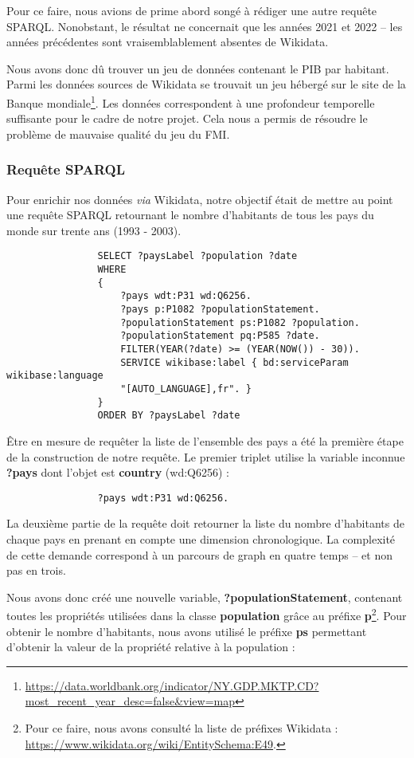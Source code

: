 \documentclass[hidelinks, 12pt]{article}
\begin{document}
			Pour ce faire, nous avions de prime abord songé à rédiger une autre requête SPARQL. Nonobstant, le résultat ne concernait que les années 2021 et 2022 -- les années précédentes sont vraisemblablement absentes de Wikidata.
		
			Nous avons donc dû trouver un jeu de données contenant le PIB par habitant. Parmi les données sources de Wikidata se trouvait un jeu hébergé sur le site de la Banque mondiale\footnote{\url{https://data.worldbank.org/indicator/NY.GDP.MKTP.CD?most_recent_year_desc=false&view=map}}. Les données correspondent à une profondeur temporelle suffisante pour le cadre de notre projet. Cela nous a permis de résoudre le problème de mauvaise qualité du jeu du FMI.
		
		
			\subsubsection{Requête SPARQL}
			
			Pour enrichir nos données \emph{via} Wikidata, notre objectif était de mettre au point une requête SPARQL retournant le nombre d'habitants de tous les pays du monde sur trente ans (1993 - 2003).
			
			\begin{verbatim}
				SELECT ?paysLabel ?population ?date
				WHERE
				{
					?pays wdt:P31 wd:Q6256.
					?pays p:P1082 ?populationStatement.
					?populationStatement ps:P1082 ?population.
					?populationStatement pq:P585 ?date.
					FILTER(YEAR(?date) >= (YEAR(NOW()) - 30)).
					SERVICE wikibase:label { bd:serviceParam wikibase:language 
					"[AUTO_LANGUAGE],fr". }
				}
				ORDER BY ?paysLabel ?date
			\end{verbatim}
		
			Être en mesure de requêter la liste de l'ensemble des pays a été la première étape de la construction de notre requête. Le premier triplet utilise la variable inconnue \textbf{?pays} dont l'objet est \textbf{country} (wd:Q6256) :
			
			\begin{verbatim}
				?pays wdt:P31 wd:Q6256.
			\end{verbatim}
			
			La deuxième partie de la requête doit retourner la liste du nombre d'habitants de chaque pays en prenant en compte une dimension chronologique. La complexité de cette demande correspond à un parcours de graph en quatre temps -- et non pas en trois.
			
			Nous avons donc créé une nouvelle variable, \textbf{?populationStatement}, contenant toutes les propriétés utilisées dans la classe \textbf{population} grâce au préfixe \textbf{p}\footnote{Pour ce faire, nous avons consulté la liste de préfixes Wikidata : \url{https://www.wikidata.org/wiki/EntitySchema:E49}.}. Pour obtenir le nombre d'habitants, nous avons utilisé le préfixe \textbf{ps} permettant d'obtenir la valeur de la propriété relative à la population :
			
\end{document}
